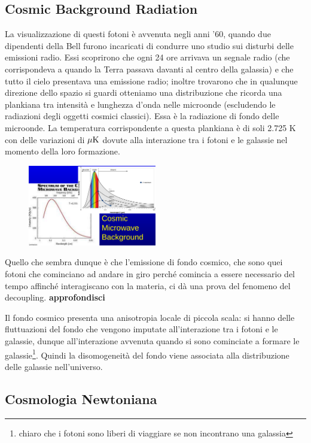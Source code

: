 \subsection{Cosmic Background Radiation}
La visualizzazione di questi fotoni è avvenuta negli anni '60, quando due dipendenti della Bell furono incaricati di condurre uno studio sui disturbi delle emissioni radio. Essi scoprirono che ogni 24 ore arrivava un segnale radio (che corrispondeva a quando la Terra passava davanti al centro della galassia) e che tutto il cielo presentava una emissione radio; inoltre trovarono che in qualunque direzione dello spazio si guardi otteniamo una distribuzione che ricorda una plankiana tra intensità e lunghezza d'onda nelle microonde (escludendo le radiazioni degli oggetti cosmici classici). Essa è la radiazione di fondo delle microonde. La temperatura corrispondente a questa plankiana è di soli 2.725 K con delle variazioni di $\rm \mu K$ dovute alla interazione tra i fotoni e le galassie nel momento della loro formazione.

\begin{figure}[H]
    \centering
    \includegraphics[width=0.5\textwidth]{immagini16dic/cmbplank.png}
\end{figure}

Quello che sembra dunque è che l'emissione di fondo cosmico, che sono quei fotoni che cominciano ad andare in giro perché comincia a essere necessario del tempo affinché interagiscano con la materia, ci dà una prova del fenomeno del decoupling. \textbf{approfondisci}

Il fondo cosmico presenta una anisotropia locale di piccola scala: si hanno delle fluttuazioni del fondo che vengono imputate all'interazione tra i fotoni e le galassie, dunque all'interazione avvenuta quando si sono cominciate a formare le galassie\footnote{\E chiaro che i fotoni sono liberi di viaggiare se non incontrano una galassia}. Quindi la disomogeneità del fondo viene associata alla distribuzione delle galassie nell'universo.

\subsection{Cosmologia Newtoniana}

